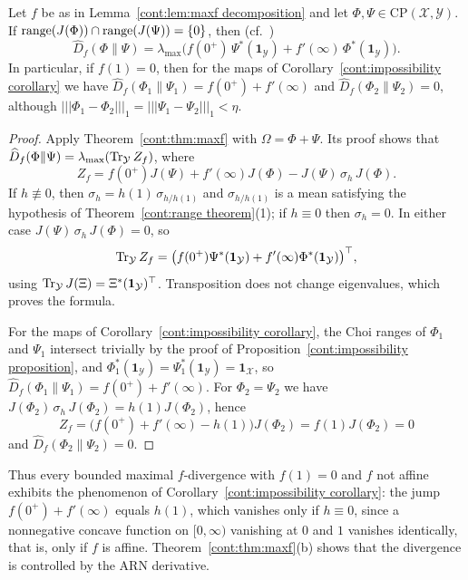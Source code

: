 \begin{corollary}\label{cont:maxf impossibility}
Let $f$ be as in Lemma~\ref{cont:lem:maxf decomposition} and let $\Phi,\Psi\in\mathrm{CP}(\mathcal{X},\mathcal{Y})$. If $\operatorname{range}(J(\Phi))\cap\operatorname{range}(J(\Psi))=\{0\}$, then (cf.\ \cite{Okayasu2026maxf})
\[
\widehat{D}_f(\Phi\|\Psi)=\lambda_{\max}\big(f(0^+)\,\Psi^*(\mathbf{1}_{\mathcal{Y}})+f'(\infty)\,\Phi^*(\mathbf{1}_{\mathcal{Y}})\big).
\]
In particular, if $f(1)=0$, then for the maps of Corollary~\ref{cont:impossibility corollary} we have $\widehat{D}_f(\Phi_1\|\Psi_1)=f(0^+)+f'(\infty)$ and $\widehat{D}_f(\Phi_2\|\Psi_2)=0$, although $|||\Phi_1-\Phi_2|||_1=|||\Psi_1-\Psi_2|||_1<\eta$.
\end{corollary}
\begin{proof}
Apply Theorem~\ref{cont:thm:maxf} with $\Omega=\Phi+\Psi$. Its proof shows that $\widehat{D}_f(\Phi\|\Psi)=\lambda_{\max}(\operatorname{Tr}_{\mathcal{Y}}Z_f)$, where
\[
Z_f=f(0^+)J(\Psi)+f'(\infty)J(\Phi)-J(\Psi)\,\sigma_h\,J(\Phi).
\]
If $h\not\equiv0$, then $\sigma_h=h(1)\,\sigma_{h/h(1)}$ and $\sigma_{h/h(1)}$ is a mean satisfying the hypothesis of Theorem~\ref{cont:range theorem}(1); if $h\equiv0$ then $\sigma_h=0$. In either case $J(\Psi)\,\sigma_h\,J(\Phi)=0$, so
\[
\operatorname{Tr}_{\mathcal{Y}}Z_f=\big(f(0^+)\Psi^*(\mathbf{1}_{\mathcal{Y}})+f'(\infty)\Phi^*(\mathbf{1}_{\mathcal{Y}})\big)^\top,
\]
using $\operatorname{Tr}_{\mathcal{Y}}J(\Xi)=\Xi^*(\mathbf{1}_{\mathcal{Y}})^\top$. Transposition does not change eigenvalues, which proves the formula.
 
For the maps of Corollary~\ref{cont:impossibility corollary}, the Choi ranges of $\Phi_1$ and $\Psi_1$ intersect trivially by the proof of Proposition~\ref{cont:impossibility proposition}, and $\Phi_1^*(\mathbf{1}_{\mathcal{Y}})=\Psi_1^*(\mathbf{1}_{\mathcal{Y}})=\mathbf{1}_{\mathcal{X}}$, so $\widehat{D}_f(\Phi_1\|\Psi_1)=f(0^+)+f'(\infty)$. For $\Phi_2=\Psi_2$ we have $J(\Phi_2)\,\sigma_h\,J(\Phi_2)=h(1)J(\Phi_2)$, hence
\[
Z_f=\big(f(0^+)+f'(\infty)-h(1)\big)J(\Phi_2)=f(1)J(\Phi_2)=0
\]
and $\widehat{D}_f(\Phi_2\|\Psi_2)=0$.
\end{proof}
 
Thus every bounded maximal $f$-divergence with $f(1)=0$ and $f$ not affine exhibits the phenomenon of Corollary~\ref{cont:impossibility corollary}: the jump $f(0^+)+f'(\infty)$ equals $h(1)$, which vanishes only if $h\equiv0$, since a nonnegative concave function on $[0,\infty)$ vanishing at $0$ and $1$ vanishes identically, that is, only if $f$ is affine. Theorem~\ref{cont:thm:maxf}(b) shows that the divergence is controlled by the ARN derivative.

